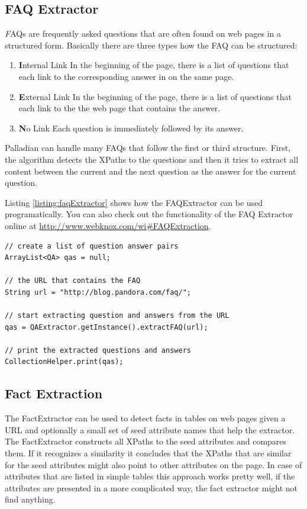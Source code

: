 \documentclass[a4paper,twoside]{book}      %
\begin{document}
\subsection{FAQ Extractor}
{\textit FAQs} are frequently asked questions that are often found on web pages in a structured form. Basically there are three types how the FAQ can be structured:
\begin{enumerate}
\item {\textbf Internal Link} In the beginning of the page, there is a list of questions that each link to the corresponding answer in on the same page.
\item {\textbf External Link} In the beginning of the page, there is a list of questions that each link to the the web page that contains the answer.
\item {\textbf No Link} Each question is immediately followed by its answer.
\end{enumerate}

Palladian can handle many FAQs that follow the first or third structure. First, the algorithm detects the XPaths to the questions and then it tries to extract all content between the current and the next question as the answer for the current question.

Listing \ref{listing:faqExtractor} shows how the FAQExtractor can be used programatically. You can also check out the functionality of the FAQ Extractor online at \url{http://www.webknox.com/wi#FAQExtraction}.

\begin{codelisting}
\label{listing:faqExtractor}
\begin{lstlisting}[frame=tb]
// create a list of question answer pairs
ArrayList<QA> qas = null;

// the URL that contains the FAQ
String url = "http://blog.pandora.com/faq/";

// start extracting question and answers from the URL
qas = QAExtractor.getInstance().extractFAQ(url);

// print the extracted questions and answers
CollectionHelper.print(qas);
\end{lstlisting}
\end{codelisting}

\subsection{Fact Extraction}
The FactExtractor can be used to detect facts in tables on web pages given a URL and optionally a small set of seed attribute names that help the extractor. The FactExtractor constructs all XPaths to the seed attributes and compares them. If it recognizes a similarity it concludes that the XPaths that are similar for the seed attributes might also point to other attributes on the page. In case of attributes that are listed in simple tables this approach works pretty well, if the attributes are presented in a more complicated way, the fact extractor might not find anything.
\end{document}

